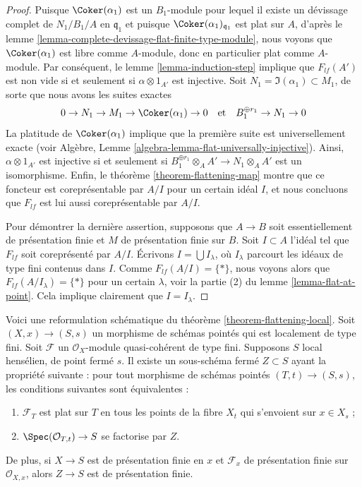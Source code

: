 \begin{proof}
\medskip\noindent
Puisque $\Coker(\alpha_1)$ est un $B_1$-module pour lequel
il existe un dévissage complet de $N_1/B_1/A$ en $\mathfrak q_1$
et puisque $\Coker(\alpha_1)_{\mathfrak q_1}$ est
plat sur $A$, d'après le
lemme \ref{lemma-complete-devissage-flat-finite-type-module},
nous voyons que $\Coker(\alpha_1)$ est libre comme $A$-module, donc en particulier
plat comme $A$-module. Par conséquent, le
lemme \ref{lemma-induction-step}
implique que $F_{lf}(A')$ est non vide si et seulement si $\alpha \otimes 1_{A'}$
est injective. Soit $N_1 = \Im(\alpha_1) \subset M_1$, de sorte que
nous avons les suites exactes
$$
0 \to N_1 \to M_1 \to \Coker(\alpha_1) \to 0
\quad\text{et}\quad
B_1^{\oplus r_1} \to N_1 \to 0
$$
La platitude de $\Coker(\alpha_1)$ implique que la première suite
est universellement exacte (voir
Algèbre, Lemme \ref{algebra-lemma-flat-universally-injective}).
Ainsi, $\alpha \otimes 1_{A'}$ est injective si et seulement si
$B_1^{\oplus r_1} \otimes_A A' \to N_1 \otimes_A A'$
est un isomorphisme. Enfin, le
théorème \ref{theorem-flattening-map}
montre que ce foncteur est coreprésentable par $A/I$ pour un certain idéal $I$,
et nous concluons que $F_{lf}$ est lui aussi coreprésentable par $A/I$.

\medskip\noindent
Pour démontrer la dernière assertion, supposons que $A \to B$ soit essentiellement de
présentation finie et $M$ de présentation finie sur $B$. Soit $I \subset A$
l'idéal tel que $F_{lf}$ soit coreprésenté par $A/I$.
Écrivons $I = \bigcup I_\lambda$, où $I_\lambda$ parcourt les idéaux de type fini
contenus dans $I$. Comme $F_{lf}(A/I) = \{*\}$,
nous voyons alors que $F_{lf}(A/I_\lambda) = \{*\}$ pour un certain $\lambda$, voir
la partie (2) du lemme \ref{lemma-flat-at-point}.
Cela implique clairement que $I = I_\lambda$.
\end{proof}

\begin{remark}
\label{remark-flattening-local-scheme-theoretic}
Voici une reformulation schématique du
théorème \ref{theorem-flattening-local}.
Soit $(X, x) \to (S, s)$ un morphisme de schémas pointés
qui est localement de type fini. Soit $\mathcal{F}$ un
$\mathcal{O}_X$-module quasi-cohérent de type fini.
Supposons $S$ local hensélien, de point fermé $s$.
Il existe un sous-schéma fermé $Z \subset S$ ayant la propriété suivante :
pour tout morphisme de schémas pointés $(T, t) \to (S, s)$, les conditions
suivantes sont équivalentes :
\begin{enumerate}
\item $\mathcal{F}_T$ est plat sur $T$ en tous les points de la fibre
$X_t$ qui s'envoient sur $x \in X_s$ ;
\item $\Spec(\mathcal{O}_{T, t}) \to S$ se factorise par $Z$.
\end{enumerate}
De plus, si $X \to S$ est de présentation finie en $x$ et $\mathcal{F}_x$
de présentation finie sur $\mathcal{O}_{X, x}$, alors $Z \to S$
est de présentation finie.
\end{remark}

